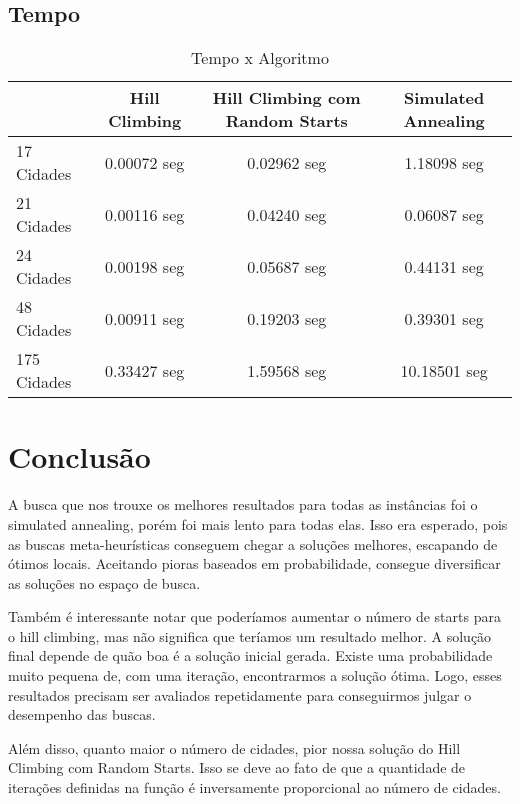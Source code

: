 \documentclass[a4paper,12 pts]{article}
\begin{document}
	\subsection{Tempo}
		\begin{table}[ht]
			\centering
			\begin{tabular}{|l|c|c|c|}
				\hline
				\multicolumn{1}{|c|}{} & Hill Climbing & Hill Climbing com Random Starts & Simulated Annealing \\ \hline
				17 Cidades  & 0.00072 seg & 0.02962 seg & 1.18098 seg \\ \hline
				21 Cidades  & 0.00116 seg & 0.04240 seg & 0.06087 seg \\ \hline
				24 Cidades  & 0.00198 seg & 0.05687 seg & 0.44131 seg \\ \hline
				48 Cidades  & 0.00911 seg & 0.19203 seg & 0.39301 seg \\ \hline
				175 Cidades & 0.33427 seg & 1.59568 seg & 10.18501 seg \\ \hline 
			\end{tabular}
			\caption{Tempo x Algoritmo}
			\label{my-time}
		\end{table}

\section{Conclusão}

	A busca que nos trouxe os melhores resultados para todas as instâncias foi o simulated annealing, porém foi mais lento para todas elas. Isso era esperado, pois as buscas meta-heurísticas conseguem chegar a soluções melhores, escapando de ótimos locais. Aceitando pioras baseados em probabilidade, consegue diversificar as soluções no espaço de busca.


	Também é interessante notar que poderíamos aumentar o número de starts para o hill climbing, mas não significa que teríamos um resultado melhor. A solução final depende de quão boa é a solução inicial gerada. Existe uma probabilidade muito pequena de, com uma iteração, encontrarmos a solução ótima. Logo, esses resultados precisam ser avaliados repetidamente para conseguirmos julgar o desempenho das buscas.


	Além disso, quanto maior o número de cidades, pior nossa solução do Hill Climbing com Random Starts. Isso se deve ao fato de que a quantidade de iterações definidas na função é inversamente proporcional ao número de cidades.
\end{document}
